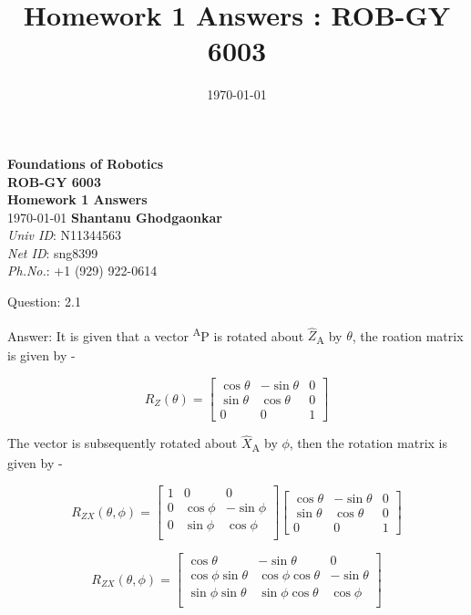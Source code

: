 \documentclass[a4paper]{article}
\title{Homework 1 Answers : ROB-GY 6003}
\author{\myName}
\date{\today}
\newcommand{\myName}{\textbf{Shantanu Ghodgaonkar}\\\textit{Univ ID}: N11344563\\\textit{Net ID}: sng8399\\\textit{Ph.No.}: +1 (929) 922-0614}
\begin{document}
	
	\begin{titlepage}
	    \centering
	    \vspace{2cm}
	    \Huge\textbf{Foundations of Robotics \\ ROB-GY 6003 \\ Homework 1 Answers}
	    \vspace{1cm}
	    \\ \Large \today
	    \vfill 
	    \Large \myName
	\end{titlepage}
	
	
	\begin{qalist}
		\item[Question: 2.1]
		\item[Answer:]
			It is given that a vector \textsuperscript{A}P is rotated about \( \hat{Z} \)\textsubscript{A} by $\theta$\degree, the roation matrix is given by - 

			\begin{equation}
			{R}_{Z} (\theta) = 
				\left[ \begin{matrix}
					\cos\theta & -\sin\theta & 0 \\
					\sin\theta & \cos\theta & 0 \\
					0 & 0 & 1
				\end{matrix} \right]
			\end{equation}
			
			The vector is subsequently rotated about \(\hat{X}\)\textsubscript{A} by $\phi$\degree, then the rotation matrix is given by - 
			
			\begin{equation}
			{R}_{Z X} (\theta,\phi) = 
				\left[ \begin{matrix}
					1 & 0 & 0 \\
					0 & \cos\phi & -\sin\phi\\
					0 & \sin\phi & \cos\phi\\
				\end{matrix} \right]
				\left[ \begin{matrix}
					\cos\theta & -\sin\theta & 0 \\
					\sin\theta & \cos\theta & 0 \\
					0 & 0 & 1
				\end{matrix} \right]
			\end{equation}
			
			\begin{equation}
			{R}_{Z X} (\theta,\phi) = 
				\left[ \begin{matrix}
					\cos\theta & -\sin\theta & 0 \\
					\cos\phi\sin\theta & \cos\phi\cos\theta & -\sin\theta\\
					\sin\phi\sin\theta & \sin\phi\cos\theta & \cos\phi\\
				\end{matrix} \right]
			\end{equation}
			

\end{qalist}
\end{document}
